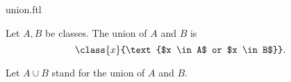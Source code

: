 \documentclass{stex}
\begin{document}
\begin{smodule}{union.ftl}

  \begin{forthel}
    \begin{definition}
      Let $A, B$ be classes.
      The union of $A$ and $B$ is
      \[\class{x}{\text{$x \in A$ or $x \in B$}}.\]
    \end{definition}

    Let $A \cup B$ stand for the union of $A$ and $B$.
  \end{forthel}
\end{smodule}
\end{document}
